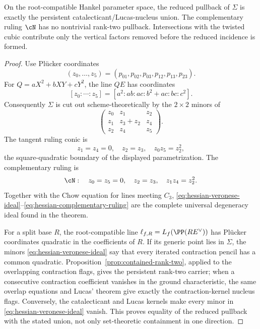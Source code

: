 \begin{proposition}\label{prop:hessian-pullback}
On the root-compatible Hankel parameter space, the reduced pullback of
$\Sigma$ is exactly the persistent catalecticant/Lucas-nucleus union.
The complementary ruling $\cN$ has no nontrivial rank-two pullback.
Intersections with the twisted cubic contribute only the vertical
factors removed before the reduced incidence is formed.
\end{proposition}

\begin{proof}
Use Pl\"ucker coordinates
\[
 (z_0,\ldots,z_5)=(p_{01},p_{02},p_{03},p_{12},p_{13},p_{23}).
\]
For $Q=aX^2+bXY+cY^2$, the line $QE$ has coordinates
\[
 [z_0:\cdots:z_5]
 =[a^2:ab:ac:b^2+ac:bc:c^2].
\]
Consequently $\Sigma$ is cut out scheme-theoretically by the
$2\times2$ minors of
\begin{equation}\label{eq:hessian-veronese-ideal}
\begin{pmatrix}
z_0&z_1&z_2\\
z_1&z_3+z_2&z_4\\
z_2&z_4&z_5
\end{pmatrix}.
\end{equation}
The tangent ruling conic is
\[
 z_1=z_4=0,\quad z_2=z_3,\quad z_0z_5=z_2^2,
\]
the square-quadratic boundary of the displayed parametrization.  The
complementary ruling is
\begin{equation}\label{eq:hessian-complementary-ruling}
 \cN:\quad z_0=z_5=0,\quad z_2=z_3,\quad z_1z_4=z_2^2.
\end{equation}
Together with the Chow equation for lines meeting $C_3$,
\eqref{eq:hessian-veronese-ideal}--\eqref{eq:hessian-complementary-ruling}
are the complete universal degeneracy ideal found in the theorem.

For a split base $R$, the root-compatible line
$\ell_{f,R}=L_f(\PP(RE^\vee))$ has Pl\"ucker coordinates quadratic
in the coefficients of $R$.  If its generic point lies in $\Sigma$,
the minors \eqref{eq:hessian-veronese-ideal} say that every iterated
contraction pencil has a common quadratic.
Proposition~\ref{prop:contained-rank-two}, applied to the
overlapping contraction flags, gives the persistent rank-two carrier;
when a consecutive contraction coefficient vanishes in the ground
characteristic, the same overlap equations and Lucas' theorem give
exactly the contraction-kernel nucleus flags.  Conversely, the
catalecticant and Lucas kernels make every minor in
\eqref{eq:hessian-veronese-ideal} vanish.
This proves equality of the reduced pullback with the stated union,
not only set-theoretic containment in one direction.


\end{proof}
